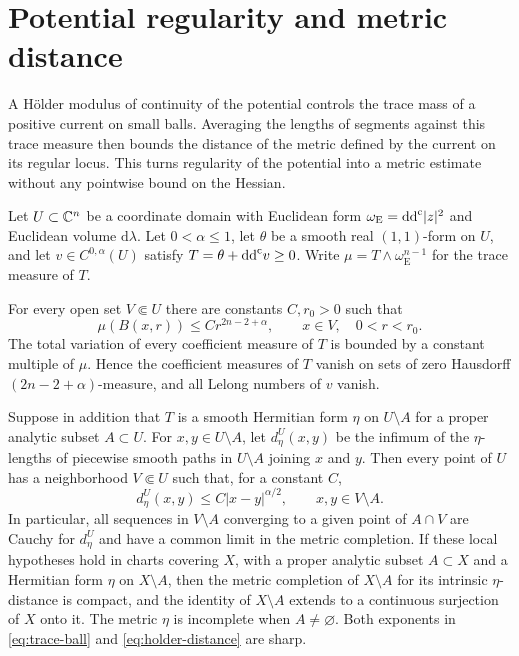 \section{Potential regularity and metric distance}
\label{sec:psh-holder-geometry}

A H\"older modulus of continuity of the potential controls the trace mass of a positive current on small balls. Averaging the lengths of segments against this trace measure then bounds the distance of the metric defined by the current on its regular locus. This turns regularity of the potential into a metric estimate without any pointwise bound on the Hessian.

Let $U\subset\mathbb C^n$ be a coordinate domain with Euclidean form $\omega_{\mathrm E}=\mathrm{dd}^{\mathrm{c}}|z|^2$ and Euclidean volume $\mathrm{d}\lambda$. Let $0<\alpha\leq1$, let $\theta$ be a smooth real $(1,1)$-form on $U$, and let $v\in C^{0,\alpha}(U)$ satisfy $T=\theta+\mathrm{dd}^{\mathrm{c}} v\geq0$. Write $\mu=T\wedge\omega_{\mathrm E}^{n-1}$ for the trace measure of $T$.

\begin{theorem}\label{thm:holder-current-distance}
For every open set $V\Subset U$ there are constants $C,r_0>0$ such that
\begin{equation}\label{eq:trace-ball}
 \mu(B(x,r))\leq C r^{2n-2+\alpha},\qquad x\in V,\quad0<r<r_0.
\end{equation}
The total variation of every coefficient measure of $T$ is bounded by a constant multiple of $\mu$. Hence the coefficient measures of $T$ vanish on sets of zero Hausdorff $(2n-2+\alpha)$-measure, and all Lelong numbers of $v$ vanish.

Suppose in addition that $T$ is a smooth Hermitian form $\eta$ on $U\setminus A$ for a proper analytic subset $A\subset U$. For $x,y\in U\setminus A$, let $d_\eta^U(x,y)$ be the infimum of the $\eta$-lengths of piecewise smooth paths in $U\setminus A$ joining $x$ and $y$. Then every point of $U$ has a neighborhood $V\Subset U$ such that, for a constant $C$,
\begin{equation}\label{eq:holder-distance}
 d_\eta^U(x,y)\leq C|x-y|^{\alpha/2},\qquad x,y\in V\setminus A.
\end{equation}
In particular, all sequences in $V\setminus A$ converging to a given point of $A\cap V$ are Cauchy for $d_\eta^U$ and have a common limit in the metric completion. If these local hypotheses hold in charts covering $X$, with a proper analytic subset $A\subset X$ and a Hermitian form $\eta$ on $X\setminus A$, then the metric completion of $X\setminus A$ for its intrinsic $\eta$-distance is compact, and the identity of $X\setminus A$ extends to a continuous surjection of $X$ onto it. The metric $\eta$ is incomplete when $A\ne\varnothing$. Both exponents in \eqref{eq:trace-ball} and \eqref{eq:holder-distance} are sharp.
\end{theorem}

